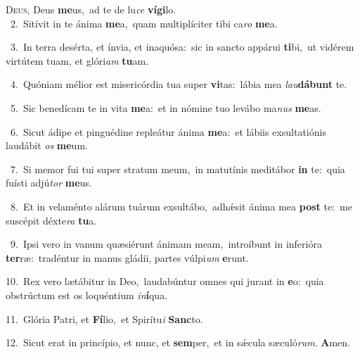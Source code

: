 \lettrine{\initial\textcolor{\initialcolor}{D}}{eus,} Deus \textbf{me}\-us,~\star ad te de lu\textit{ce} \textbf{ví}\-\textbf{gi}lo.\\
{\numbfont\textcolor{\numbcolor}{~2.}}~Sitívit in te ánima \textbf{me}\-a,~\star quam multiplíciter tibi ca\textit{ro} \textbf{me}\-a.\par
{\numbfont\textcolor{\numbcolor}{~3.}}~In terra desérta, et ínvia, et inaquósa:~\dagger sic in sancto appárui \textbf{ti}\-bi,~\star ut vidérem virtútem tuam, et glóri\textit{am} \textbf{tu}\-am.\par
{\numbfont\textcolor{\numbcolor}{~4.}}~Quóniam mélior est misericórdia tua super \textbf{vi}\-tas:~\star lábia mea \textit{lau}\-\textbf{dá}\textbf{bunt} te.\par
{\numbfont\textcolor{\numbcolor}{~5.}}~Sic benedícam te in vita \textbf{me}\-a:~\star et in nómine tuo levábo ma\textit{nus} \textbf{me}\-as.\par
{\numbfont\textcolor{\numbcolor}{~6.}}~Sicut ádipe et pinguédine repleátur ánima \textbf{me}\-a:~\star et lábiis exsultatiónis laudábit \textit{os} \textbf{me}\-um.\par
{\numbfont\textcolor{\numbcolor}{~7.}}~Si memor fui tui super stratum meum,~\dagger in matutínis meditábor \textbf{in} te:~\star quia fuísti adjú\textit{tor} \textbf{me}\-us.\par
{\numbfont\textcolor{\numbcolor}{~8.}}~Et in velaménto alárum tuárum exsultábo,~\dagger adhǽsit ánima mea \textbf{post} te:~\star me suscépit déxte\textit{ra} \textbf{tu}\-a.\par
{\numbfont\textcolor{\numbcolor}{~9.}}~Ipsi vero in vanum quæsiérunt ánimam meam,~\dagger introíbunt in inferióra \textbf{ter}\-ræ:~\star tradéntur in manus gládii, partes vúlpi\textit{um} \textbf{e}\-runt.\par
{\numbfont\textcolor{\numbcolor}{10.}}~Rex vero lætábitur in Deo,~\dagger laudabúntur omnes qui jurant in \textbf{e}\-o:~\star quia obstrúctum est os loquéntium \textit{in}\-\textbf{í}qua.\par
{\numbfont\textcolor{\numbcolor}{11.}}~Glória Patri, et \textbf{Fí}\-lio,~\star et Spirítu\textit{i} \textbf{Sanc}\-to.\par
{\numbfont\textcolor{\numbcolor}{12.}}~Sicut erat in princípio, et nunc, et \textbf{sem}\-per,~\star et in sǽcula sæculó\-\textit{rum}\-. \textbf{A}\-men.\par
